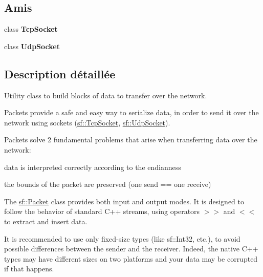 \subsection*{Amis}
\begin{DoxyCompactItemize}
\item 
\mbox{\label{classsf_1_1Packet_aa8b32310b01d4bb702d6bcb969d5f130}} 
class {\bfseries Tcp\+Socket}
\item 
\mbox{\label{classsf_1_1Packet_ae128c6687ced82c6157c5f865f8dec5c}} 
class {\bfseries Udp\+Socket}
\end{DoxyCompactItemize}


\subsection{Description détaillée}
Utility class to build blocks of data to transfer over the network. 

Packets provide a safe and easy way to serialize data, in order to send it over the network using sockets (\hyperlink{classsf_1_1TcpSocket}{sf\+::\+Tcp\+Socket}, \hyperlink{classsf_1_1UdpSocket}{sf\+::\+Udp\+Socket}).

Packets solve 2 fundamental problems that arise when transferring data over the network\+: \begin{DoxyItemize}
\item data is interpreted correctly according to the endianness \item the bounds of the packet are preserved (one send == one receive)\end{DoxyItemize}
The \hyperlink{classsf_1_1Packet}{sf\+::\+Packet} class provides both input and output modes. It is designed to follow the behavior of standard C++ streams, using operators $>$$>$ and $<$$<$ to extract and insert data.

It is recommended to use only fixed-\/size types (like sf\+::\+Int32, etc.), to avoid possible differences between the sender and the receiver. Indeed, the native C++ types may have different sizes on two platforms and your data may be corrupted if that happens.

